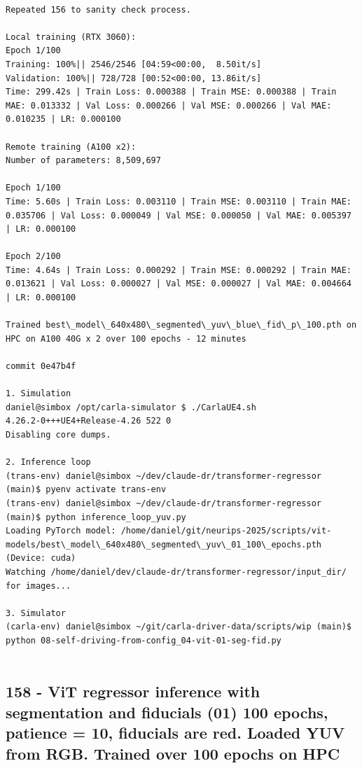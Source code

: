 \begin{verbatim}

Repeated 156 to sanity check process.

Local training (RTX 3060):
Epoch 1/100
Training: 100%|| 2546/2546 [04:59<00:00,  8.50it/s]
Validation: 100%|| 728/728 [00:52<00:00, 13.86it/s]
Time: 299.42s | Train Loss: 0.000388 | Train MSE: 0.000388 | Train MAE: 0.013332 | Val Loss: 0.000266 | Val MSE: 0.000266 | Val MAE: 0.010235 | LR: 0.000100

Remote training (A100 x2):
Number of parameters: 8,509,697

Epoch 1/100
Time: 5.60s | Train Loss: 0.003110 | Train MSE: 0.003110 | Train MAE: 0.035706 | Val Loss: 0.000049 | Val MSE: 0.000050 | Val MAE: 0.005397 | LR: 0.000100

Epoch 2/100
Time: 4.64s | Train Loss: 0.000292 | Train MSE: 0.000292 | Train MAE: 0.013621 | Val Loss: 0.000027 | Val MSE: 0.000027 | Val MAE: 0.004664 | LR: 0.000100

Trained best\_model\_640x480\_segmented\_yuv\_blue\_fid\_p\_100.pth on HPC on A100 40G x 2 over 100 epochs - 12 minutes

commit 0e47b4f

1. Simulation
daniel@simbox /opt/carla-simulator $ ./CarlaUE4.sh 
4.26.2-0+++UE4+Release-4.26 522 0
Disabling core dumps.

2. Inference loop
(trans-env) daniel@simbox ~/dev/claude-dr/transformer-regressor (main)$ pyenv activate trans-env
(trans-env) daniel@simbox ~/dev/claude-dr/transformer-regressor (main)$ python inference_loop_yuv.py 
Loading PyTorch model: /home/daniel/git/neurips-2025/scripts/vit-models/best\_model\_640x480\_segmented\_yuv\_01_100\_epochs.pth (Device: cuda)
Watching /home/daniel/dev/claude-dr/transformer-regressor/input_dir/ for images...

3. Simulator
(carla-env) daniel@simbox ~/git/carla-driver-data/scripts/wip (main)$ python 08-self-driving-from-config_04-vit-01-seg-fid.py 
 
\end{verbatim}

\subsection{158 - ViT regressor inference with segmentation and fiducials (01) 100 epochs, patience = 10, fiducials are red. Loaded YUV from RGB. Trained over 100 epochs on HPC}
\label{app_res:158}

